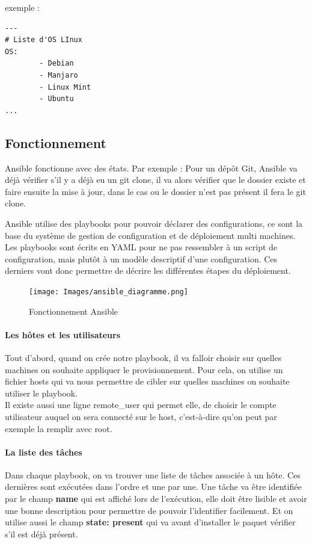 \documentclass[]{article}
\let\oldparagraph\paragraph
\renewcommand{\paragraph}[1]{\oldparagraph{#1}\mbox{}}
\begin{document}
exemple :
\begin{verbatim}
---
# Liste d'OS LInux
OS:
        - Debian
        - Manjaro
        - Linux Mint
        - Ubuntu
...
\end{verbatim}

\subsection{Fonctionnement}\label{fonctionnement-1}
Ansible fonctionne avec des états.
Par exemple :
Pour un dépôt Git, Ansible va déjà vérifier s'il y a déjà eu un git clone, il va alors vérifier que le dossier existe et faire ensuite la mise à jour, dans le cas ou le dossier n'est pas présent il fera le git clone.

Ansible utilise des playbooks pour pouvoir déclarer des configurations,
ce sont la base du système de gestion de configuration et de déploiement
multi machines. Les playbooks sont écrits en YAML pour ne pas ressembler
à un script de configuration, mais plutôt à un modèle descriptif d'une
configuration. Ces derniers vont donc permettre de décrire les différentes étapes du déploiement.
\begin{figure}
\centering
\texttt{[image: Images/ansible\_diagramme.png]}
\caption{Fonctionnement Ansible}
\end{figure}

\paragraph{Les hôtes et les utilisateurs}\label{les-huxf4tes-et-les-utilisateurs}
Tout d'abord, quand on crée notre playbook, il va falloir choisir sur
quelles machines on souhaite appliquer le provisionnement. Pour cela, on
utilise un fichier hosts qui va nous permettre de cibler sur quelles
machines on souhaite utiliser le playbook.\\
 Il existe aussi une ligne remote\_user qui permet elle, de choisir le compte utilisateur auquel
on sera connecté sur le host, c'est-à-dire qu'on peut par exemple la
remplir avec root.

\paragraph{La liste des tâches}\label{la-liste-des-tuxe2ches}
Dans chaque playbook, on va trouver une liste de tâches associée à un
hôte. Ces dernières sont exécutées dans l'ordre et une par une. Une
tâche va être identifiée par le champ \textbf{name} qui est affiché lors de
l'exécution, elle doit être lisible et avoir une bonne description pour
permettre de pouvoir l'identifier facilement.
Et on utilise aussi le champ \textbf{state: present} qui va avant d'installer le paquet vérifier s’il est déjà présent.
\end{document}
